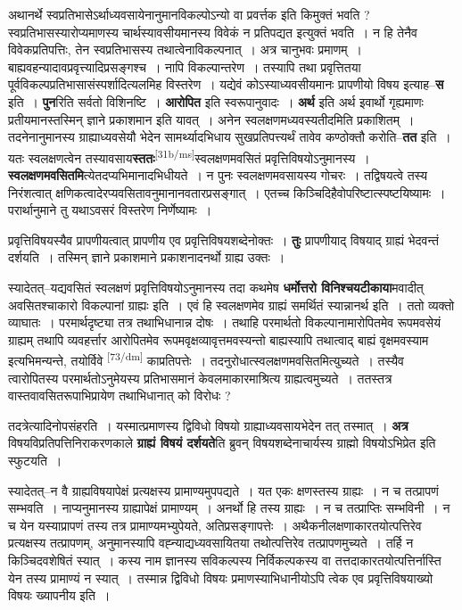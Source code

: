 \documentclass[article,12pt,a4paper]{memoir}
\begin{document}
	  \pstart अथानर्थे स्वप्रतिभासेऽर्थाध्यवसायेनानुमानविकल्पोऽन्यो वा प्रवर्त्तक इति किमुक्तं भवति ? स्वप्रतिभासस्यारोप्यमाणस्य चार्थस्यावसीयमानस्य विवेकं न प्रतिपद्यत इत्युक्तं भवति । न हि तेनैव विवेकप्रतिपत्तिः, तेन स्वप्रतिभासस्य तथात्वेनाविकल्पनात् । अत्र चानुभवः प्रमाणम् । बाह्यवहन्यादावप्रवृत्त्यादिप्रसङ्गश्च । नापि विकल्पान्तरेण । तस्यापि तथा प्रवृत्तितया पूर्वविकल्पप्रतिभासासंस्पर्शादित्यलमिह विस्तरेण । यद्येवं कोऽस्याध्यवसीयमानः प्रापणीयो विषय इत्याह--\textbf{स} इति । \textbf{पुन}रिति सर्वतो विशिनष्टि । \textbf{आरोपित} इति स्वरूपानुवादः । \textbf{अर्थ} इति अर्थ इवार्थो गृह्यमाणः प्रतीयमानस्तस्मिन् ज्ञाने प्रकाशमान इति यावत् । अनेन स्वलक्षणमध्यवस्यतीदमिति प्रकाशितम् । तदनेनानुमानस्य ग्राह्याध्यवसेयौ भेदेन सामर्थ्यादभिधाय सुखप्रतिपत्त्यर्थं तावेव कण्ठोक्तौ करोति--\textbf{तत} इति । यतः स्वलक्षणत्वेन तस्यावसाय\textbf{स्ततः}\leavevmode\textsuperscript{\rmlatinfont\tiny [31b/ms]}स्वलक्षणमवसितं प्रवृत्तिविषयोऽनुमानस्य । \textbf{स्वलक्षणमवसितमि}त्येतदप्यभिमानादभिधीयते । न पुनः स्वलक्षणमवसायस्य गोचरः । तद्विषयत्वे तस्य निरंशत्वात् क्षणिकत्वादेरप्यवसितावनुमानानवतारप्रसङ्गात् । एतच्च किञ्चिदिहैवोपरिष्टात्स्पष्टयिष्यामः । परार्थानुमाने तु यथाऽवसरं विस्तरेण निर्णेष्यामः ।
	\pend
      

	  \pstart प्रवृत्तिविषयस्यैव प्रापणीयत्वात् प्रापणीय एव प्रवृत्तिविषयशब्देनोक्तः । \textbf{तुः} प्रापणीयाद् विषयाद् ग्राह्यं भेदवन्तं दर्शयति । तस्मिन् ज्ञाने प्रकाशमाने प्रकाशनादनर्थो ग्राह्य उक्तः ।
	\pend
      

	  \pstart स्यादेतत्--यद्यवसितं स्वलक्षणं प्रवृत्तिविषयोऽनुमानस्य तदा कथमेष \textbf{धर्मोत्तरो विनिश्चयटीकाया}मवादीत् अवसितश्चाकारो विकल्पानां ग्राह्यः इति । एवं हि स्वलक्षणमेव ग्राह्यं समर्थितं स्यान्नानर्थ इति । ततो व्यक्तो व्याघातः । परमार्थदृष्ट्या तत्र तथाभिधानान्न दोषः । तथाहि परमार्थतो विकल्पानामारोपितमेव रूपमवसेयं ग्राह्यम् तथापि व्यवहर्त्तार आरोपितमेव रूपमवृक्षव्यावृत्तमवस्यन्तो बाह्यस्यापि तथात्वाद् बाह्यं वृक्षमवस्याम इत्यभिमन्यन्ते, तयोर्विवे  \leavevmode\textsuperscript{\rmlatinfont\tiny [73/dm]} काप्रतिपत्तेः । तदनुरोधात्स्वलक्षणमवसितमित्युच्यते । तस्यैव त्वारोपितस्य परमार्थतोऽनुमेयस्य प्रतिभासमानं केवलमाकारमाश्रित्य ग्राह्यत्वमुच्यते । ततस्तत्र वास्तवावसितरूपाभिप्रायेण तथाभिधानात् को विरोधः ?
	\pend
      

	  \pstart तदत्रेत्यादिनोपसंहरति । यस्मात्प्रमाणस्य द्विविधो विषयो ग्राह्याध्यवसायभेदेन तत् तस्मात् । \textbf{अत्र} विषयविप्रतिपत्तिनिराकरणकाले \textbf{ग्राह्यं विषयं दर्शयते}ति ब्रुवन् विषयशब्देनाचार्यस्य ग्राह्मो विषयोऽभिप्रेत इति स्फुटयति ।
	\pend
      

	  \pstart स्यादेतत्--न वै ग्राह्यविषयापेक्षं प्रत्यक्षस्य प्रामाण्यमुपपद्यते । यत एकः क्षणस्तस्य ग्राह्यः । न च तत्प्रापणं सम्भवति । नाप्यनुमानस्य ग्राह्यापेक्षं प्रामाण्यम् । अनर्थो हि तस्य ग्राह्यः । न च तत्प्राप्तिः सम्भविनी । न च येन यस्याप्रापणं तस्य तत्र प्रामाण्यमभ्युपेयते, अतिप्रसङ्गापत्तेः । अथैकनीलक्षणाकारतयोत्पत्तिरेव प्रत्यक्षस्य तत्प्रापणम्, अनुमानस्यापि वह्न्याद्यध्यवसायितया तथोत्पत्तिरेव तत्प्रापणमुच्यते । तर्हि न किञ्चिदवशेषितं स्यात् । कस्य नाम ज्ञानस्य सविकल्पस्य निर्विकल्पकस्य वा तत्तदाकारतयोत्पत्तिर्नास्ति येन तस्य प्रामाण्यं न स्यात् । तस्मान्न द्विविधो विषयः प्रमाणस्याभिधानीयोऽपि त्वेक एव प्रवृत्तिविषयाख्यो विषयः ख्यापनीय इति ।
	\pend
      
\end{document}
